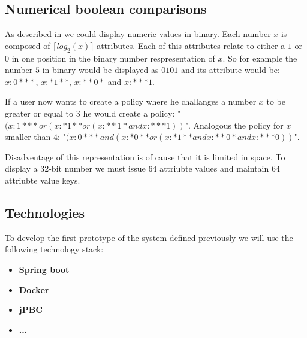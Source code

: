 \subsection{Numerical boolean comparisons}
As described in \cite{bethencourt2007ciphertext} we could display numeric values in binary. Each number $x$ is composed of $\lceil log_2(x) \rceil$ attributes. Each of this attributes relate to either a $1$ or $0$ in one position in the binary number respresentation of $x$. So for example the number $5$ in binary would be displayed as $0101$ and its attribute would be: $x:0***$, $x:*1**$, $x:**0*$ and $x:***1$. 

If a user now wants to create a policy where he challanges a number $x$ to be greater or equal to $3$ he would create a policy: "$(x:1*** or (x:*1** or (x:**1* and x:***1))$". Analogous the policy for $x$ smaller than $4$: "$(x:0*** and (x:*0** or (x:*1** and x:**0* and x:***0))$".

Disadventage of this representation is of cause that it is limited in space. To display a 32-bit number we must issue 64 attriubte values and maintain 64 attriubte value keys. 


\subsection{Technologies}
To develop the first prototype of the system defined previously we will use the following technology stack:

\begin{itemize}
	\item \textbf{Spring boot}
	\item \textbf{Docker}
	\item \textbf{jPBC} \cite{ISCC:DecIov11}
	\item \textbf{...}
\end{itemize}


